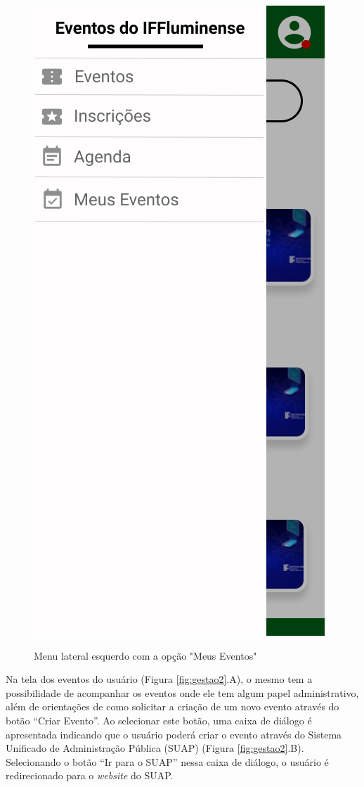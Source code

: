 \begin{figure}[H]
    \centering
    \caption{Menu lateral esquerdo com a opção "Meus Eventos"}
    \includegraphics[scale=0.44]{figuras/Gestao/1-MenuEsquerdo.jpg}
    \label{fig:gestao1}
\end{figure}

Na tela dos eventos do usuário (Figura \ref{fig:gestao2}.A), o mesmo tem a possibilidade de acompanhar os eventos onde ele tem algum papel administrativo, além de orientações de como solicitar a criação de um novo evento através do botão “Criar Evento”. Ao selecionar este botão, uma caixa de diálogo é apresentada indicando que o usuário poderá criar o evento através do Sistema Unificado de Administração Pública (SUAP) (Figura \ref{fig:gestao2}.B). Selecionando o botão “Ir para o SUAP” nessa caixa de diálogo, o usuário é redirecionado para o \textit{website} do SUAP.

